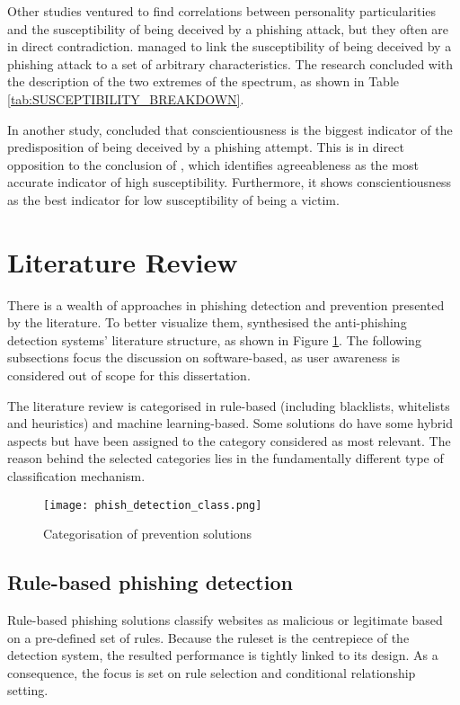 Other studies ventured to find correlations between personality particularities and the susceptibility of being deceived by a phishing attack, but they often are in direct contradiction. \cite{Darwish} managed to link the susceptibility of being deceived by a phishing attack to a set of arbitrary characteristics. The research concluded with the description of the two extremes of the spectrum, as shown in Table \ref{tab:SUSCEPTIBILITY_BREAKDOWN}.

In another study, \cite{Tzipora_Halevi} concluded that conscientiousness is the biggest indicator of the predisposition of being deceived by a phishing attempt. This is in direct opposition to the conclusion of \cite{Darwish}, which identifies agreeableness as the most accurate indicator of high susceptibility. Furthermore, it shows conscientiousness as the best indicator for low susceptibility of being a victim.


\section{Literature Review}
\label{sec:literature_review}
There is a wealth of approaches in phishing detection and prevention presented by the literature. To better visualize them, \cite{Sahingoz_Ozgur} synthesised the anti-phishing detection systems' literature structure, as shown in Figure \ref{fig:SOLUTION_CATEGORIES}. The following subsections focus the discussion on software-based, as user awareness is considered out of scope for this dissertation.

The literature review is categorised in rule-based (including blacklists, whitelists and heuristics) and machine learning-based. Some solutions do have some hybrid aspects but have been assigned to the category considered as most relevant. The reason behind the selected categories lies in the fundamentally different type of classification mechanism.

\begin{figure}[t]
	\centering
	\texttt{[image: phish\_detection\_class.png]}
	\caption{
		Categorisation of prevention solutions
		\citep{Sahingoz_Ozgur}}
	\label{fig:SOLUTION_CATEGORIES}
\end{figure}

\subsection{Rule-based phishing detection}
\label{subsec:rule-based_detection}
Rule-based phishing solutions classify websites as malicious or legitimate based on a pre-defined set of rules. Because the ruleset is the centrepiece of the detection system, the resulted performance is tightly linked to its design. As a consequence, the focus is set on rule selection and conditional relationship setting.

